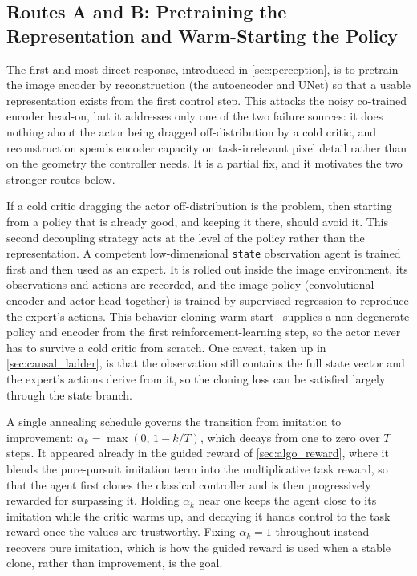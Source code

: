 \subsection{Routes A and B: Pretraining the Representation and Warm-Starting the Policy}

The first and most direct response, introduced in \cref{sec:perception}, is to pretrain the image encoder by reconstruction (the autoencoder and UNet) so that a usable representation exists from the first control step. This attacks the noisy co-trained encoder head-on, but it addresses only one of the two failure sources: it does nothing about the actor being dragged off-distribution by a cold critic, and reconstruction spends encoder capacity on task-irrelevant pixel detail rather than on the geometry the controller needs. It is a partial fix, and it motivates the two stronger routes below.

If a cold critic dragging the actor off-distribution is the problem, then starting from a policy that is already good, and keeping it there, should avoid it. This second decoupling strategy acts at the level of the policy rather than the representation. A competent low-dimensional \texttt{state} observation agent is trained first and then used as an expert. It is rolled out inside the image environment, its observations and actions are recorded, and the image policy (convolutional encoder and actor head together) is trained by supervised regression to reproduce the expert's actions. This behavior-cloning warm-start~\cite{bojarski2016end} supplies a non-degenerate policy and encoder from the first reinforcement-learning step, so the actor never has to survive a cold critic from scratch. One caveat, taken up in \cref{sec:causal_ladder}, is that the observation still contains the full state vector and the expert's actions derive from it, so the cloning loss can be satisfied largely through the state branch.

A single annealing schedule governs the transition from imitation to improvement: $\alpha_k = \max(0,\, 1 - k/T)$, which decays from one to zero over $T$ steps. It appeared already in the guided reward of \cref{sec:algo_reward}, where it blends the pure-pursuit imitation term into the multiplicative task reward, so that the agent first clones the classical controller and is then progressively rewarded for surpassing it. Holding $\alpha_k$ near one keeps the agent close to its imitation while the critic warms up, and decaying it hands control to the task reward once the values are trustworthy. Fixing $\alpha_k = 1$ throughout instead recovers pure imitation, which is how the guided reward is used when a stable clone, rather than improvement, is the goal.


